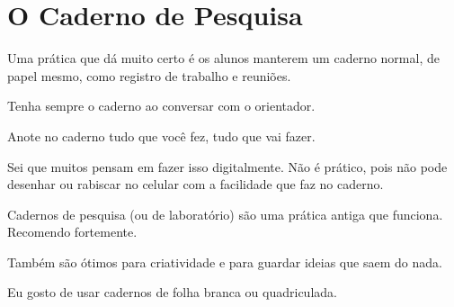 \chapter{O Caderno de Pesquisa}

Uma prática que dá muito certo é os alunos manterem um caderno normal, de papel mesmo, como registro de trabalho e reuniões.

Tenha sempre o caderno ao conversar com o orientador.

Anote no caderno tudo que você fez, tudo que vai fazer.

Sei que muitos pensam em fazer isso digitalmente. Não é prático, pois não pode desenhar ou rabiscar no celular com a facilidade que faz no caderno.

Cadernos de pesquisa (ou de laboratório) são uma prática antiga que funciona. Recomendo fortemente.

Também são ótimos para criatividade e para guardar ideias que saem do nada.

Eu gosto de usar cadernos de folha branca ou quadriculada.

